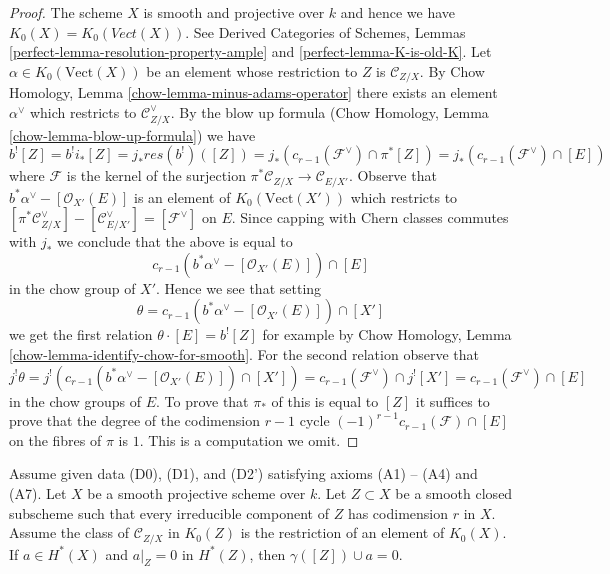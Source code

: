 \begin{proof}
The scheme $X$ is smooth and projective over $k$ and hence we have
$K_0(X) = K_0(\textit{Vect}(X))$. See
Derived Categories of Schemes, Lemmas
\ref{perfect-lemma-resolution-property-ample} and
\ref{perfect-lemma-K-is-old-K}.
Let $\alpha \in K_0(\text{Vect}(X))$ be an element
whose restriction to $Z$ is $\mathcal{C}_{Z/X}$.
By Chow Homology, Lemma \ref{chow-lemma-minus-adams-operator}
there exists an element $\alpha^\vee$ which restricts to
$\mathcal{C}_{Z/X}^\vee$. By the blow up formula
(Chow Homology, Lemma \ref{chow-lemma-blow-up-formula})
we have
$$
b^![Z] = b^!i_*[Z] = j_* res(b^!)([Z]) =
j_*(c_{r - 1}(\mathcal{F}^\vee) \cap \pi^*[Z]) =
j_*(c_{r - 1}(\mathcal{F}^\vee) \cap [E])
$$
where $\mathcal{F}$ is the kernel of the surjection
$\pi^*\mathcal{C}_{Z/X} \to \mathcal{C}_{E/X'}$.
Observe that $b^*\alpha^\vee - [\mathcal{O}_{X'}(E)]$
is an element of $K_0(\text{Vect}(X'))$ which
restricts to $[\pi^*\mathcal{C}_{Z/X}^\vee] - [\mathcal{C}_{E/X'}^\vee] =
[\mathcal{F}^\vee]$ on $E$. Since capping with Chern classes
commutes with $j_*$ we conclude that the above is equal to
$$
c_{r - 1}(b^*\alpha^\vee - [\mathcal{O}_{X'}(E)]) \cap [E]
$$
in the chow group of $X'$. Hence we see that setting
$$
\theta = c_{r - 1}(b^*\alpha^\vee - [\mathcal{O}_{X'}(E)]) \cap [X']
$$
we get the first relation $\theta \cdot [E] = b^![Z]$
for example by Chow Homology, Lemma \ref{chow-lemma-identify-chow-for-smooth}.
For the second relation observe that
$$
j^!\theta = j^!(c_{r - 1}(b^*\alpha^\vee - [\mathcal{O}_{X'}(E)]) \cap [X'])
= c_{r - 1}(\mathcal{F}^\vee) \cap j^![X'] =
c_{r - 1}(\mathcal{F}^\vee) \cap [E]
$$
in the chow groups of $E$. To prove that $\pi_*$ of this is equal to $[Z]$ it
suffices to prove that the degree of the codimension $r - 1$ cycle
$(-1)^{r - 1}c_{r - 1}(\mathcal{F}) \cap [E]$ on the fibres of $\pi$ is $1$.
This is a computation we omit.
\end{proof}

\begin{lemma}
\label{lemma-A5-A6-imply}
Assume given data (D0), (D1), and (D2') satisfying axioms (A1) -- (A4)
and (A7). Let $X$ be a smooth projective scheme over $k$. Let $Z \subset X$
be a smooth closed subscheme such that every irreducible component of $Z$
has codimension $r$ in $X$. Assume the class of
$\mathcal{C}_{Z/X}$ in $K_0(Z)$ is the restriction of an element of $K_0(X)$.
If $a \in H^*(X)$ and $a|_Z = 0$ in $H^*(Z)$, then
$\gamma([Z]) \cup a = 0$.
\end{lemma}


